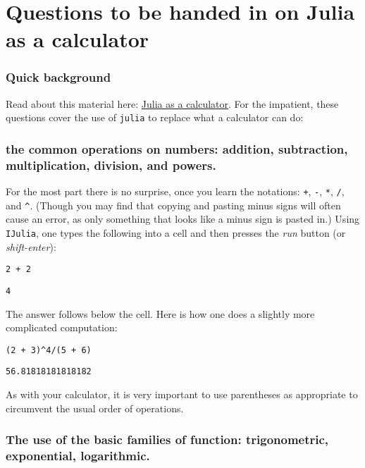 \documentclass[12pt]{article}
\begin{document}
\section{Questions to be handed in on Julia as a calculator}\subsubsection{Quick background}\newline
Read about this material here: \href{http://mth229.github.io/calculator.html}{Julia as a calculator}.\newline
For the impatient, these questions cover the use of \texttt{julia} to replace what a calculator can do:\subsubsection{the common operations on numbers: addition, subtraction,  multiplication, division, and powers.}\newline
For the most part there is no surprise, once you learn the notations:   \texttt{+}, \texttt{-}, \texttt{*}, \texttt{/}, and \texttt{^}. (Though you may find that copying and   pasting minus signs will often cause an error, as only something   that looks like a minus sign is pasted in.)\newline
Using \texttt{IJulia}, one types the following into a cell and then presses the \textit{run} button (or \textit{shift-enter}):\begin{verbatim}
2 + 2
\end{verbatim}
\begin{verbatim}
4\end{verbatim}
\newline
The answer follows below the cell.\newline
Here is how one does a slightly more complicated computation:\begin{verbatim}
(2 + 3)^4/(5 + 6)
\end{verbatim}
\begin{verbatim}
56.81818181818182\end{verbatim}
\newline
As with your calculator, it is very important to use parentheses as appropriate to circumvent the usual order of operations.\subsubsection{The use of the basic families of function: trigonometric, exponential, logarithmic.}\newline
\end{document}
